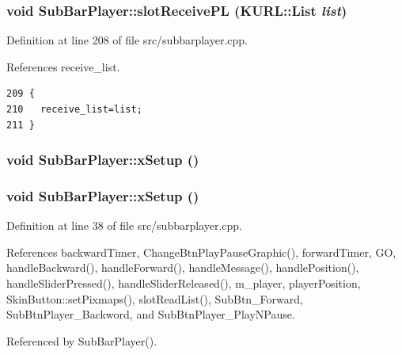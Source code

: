 \subsubsection{\setlength{\rightskip}{0pt plus 5cm}void Sub\-Bar\-Player::slot\-Receive\-PL (KURL::List {\em list})\hspace{0.3cm}{\tt  [slot]}}\label{classSubBarPlayer_SubBarPlayeri15}




Definition at line 208 of file src/subbarplayer.cpp.

References receive\_\-list.



\footnotesize\begin{verbatim}209 {
210   receive_list=list;
211 }
\end{verbatim}\normalsize 
{}
\subsubsection{\setlength{\rightskip}{0pt plus 5cm}void Sub\-Bar\-Player::x\-Setup ()}\label{classSubBarPlayer_SubBarPlayera5}


\subsubsection{\setlength{\rightskip}{0pt plus 5cm}void Sub\-Bar\-Player::x\-Setup ()}\label{classSubBarPlayer_SubBarPlayera2}




Definition at line 38 of file src/subbarplayer.cpp.

References backward\-Timer, Change\-Btn\-Play\-Pause\-Graphic(), forward\-Timer, GO, handle\-Backward(), handle\-Forward(), handle\-Message(), handle\-Position(), handle\-Slider\-Pressed(), handle\-Slider\-Released(), m\_\-player, player\-Position, Skin\-Button::set\-Pixmaps(), slot\-Read\-List(), Sub\-Btn\_\-Forward, Sub\-Btn\-Player\_\-Backword, and Sub\-Btn\-Player\_\-Play\-NPause.

Referenced by Sub\-Bar\-Player().



